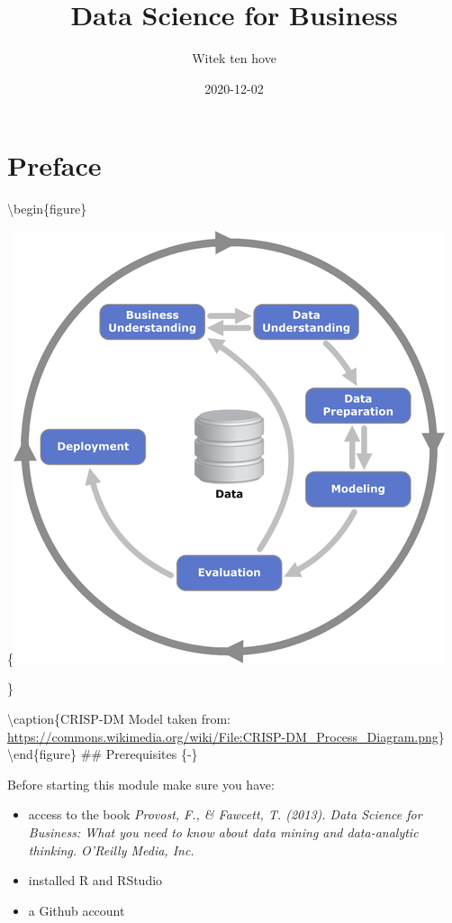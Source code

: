\documentclass[
]{book}
\title{Data Science for Business}
\author{Witek ten hove}
\date{2020-12-02}
\providecommand{\tightlist}{%
  \setlength{\itemsep}{0pt}\setlength{\parskip}{0pt}}
\begin{document}
\maketitle

{
\setcounter{tocdepth}{1}
\tableofcontents
}
\hypertarget{preface}{%
\chapter*{Preface}\label{preface}}

\textbackslash begin\{figure\}

\{\centering \includegraphics[width=0.8\linewidth]{images/crisp}

\}

\textbackslash caption\{CRISP-DM Model taken from: \url{https://commons.wikimedia.org/wiki/File:CRISP-DM_Process_Diagram.png}\}\label{fig:title-fig}
\textbackslash end\{figure\}
\#\# Prerequisites \{-\}

Before starting this module make sure you have:

\begin{itemize}
\tightlist
\item
  access to the book \emph{Provost, F., \& Fawcett, T. (2013). Data Science for Business: What you need to know about data mining and data-analytic thinking. O'Reilly Media, Inc.}
\item
  installed R and RStudio
\item
  a Github account
\end{itemize}
\end{document}
